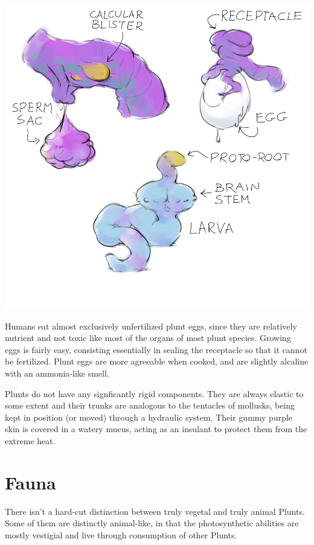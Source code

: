 \documentclass[10pt,oneside]{memoir}
\begin{document}
\begin{center}
\includegraphics[scale=1.9]{../drawings/pluntorgans.png}
\end{center}

Humans eat almost exclusively unfertilized plunt eggs, since they are relatively nutrient and not toxic like most of the organs of most plunt species. Growing eggs is fairly easy, consisting essentially in sealing the receptacle so that it cannot be fertilized. Plunt eggs are more agreeable when cooked, and are slightly alcaline with an ammonia-like smell.

Plunts do not have any signficantly rigid components. They are always elastic to some extent and their trunks are analogous to the tentacles of mollusks, being kept in position (or moved) through a hydraulic system. Their gummy purple skin is covered in a watery mucus, acting as an insulant to protect them from the extreme heat. 

\vfill
\section{Fauna}

There isn't a hard-cut distinction between truly vegetal and truly animal Plunts. Some of them are distinctly animal-like, in that the photosynthetic abilities are mostly vestigial and live through consumption of other Plunts.
\end{document}
